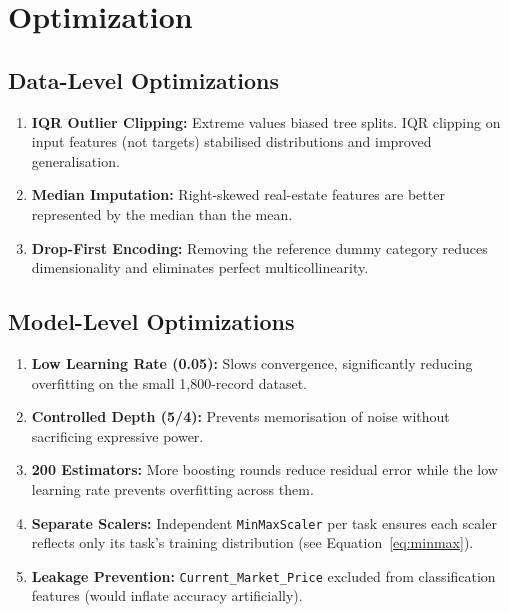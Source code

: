 \documentclass[12pt,a4paper]{article}
\begin{document}
\section{Optimization}

\subsection{Data-Level Optimizations}

\begin{enumerate}
    \item \textbf{IQR Outlier Clipping:} Extreme values biased tree splits.
          IQR clipping on input features (not targets) stabilised distributions
          and improved generalisation.
    \item \textbf{Median Imputation:} Right-skewed real-estate features are
          better represented by the median than the mean.
    \item \textbf{Drop-First Encoding:} Removing the reference dummy category
          reduces dimensionality and eliminates perfect multicollinearity.
\end{enumerate}

\subsection{Model-Level Optimizations}

\begin{enumerate}
    \item \textbf{Low Learning Rate (0.05):} Slows convergence, significantly
          reducing overfitting on the small 1,800-record dataset.
    \item \textbf{Controlled Depth (5/4):} Prevents memorisation of noise
          without sacrificing expressive power.
    \item \textbf{200 Estimators:} More boosting rounds reduce residual error
          while the low learning rate prevents overfitting across them.
    \item \textbf{Separate Scalers:} Independent \texttt{MinMaxScaler} per
          task ensures each scaler reflects only its task's training distribution
          (see Equation~\ref{eq:minmax}).
    \item \textbf{Leakage Prevention:} \texttt{Current\_Market\_Price} excluded
          from classification features (would inflate accuracy artificially).
\end{enumerate}
\end{document}
